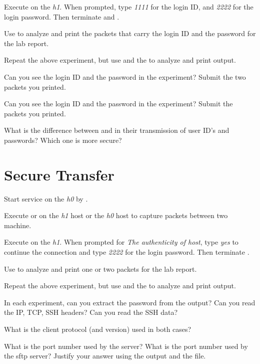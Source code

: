 \documentclass{../UTNetLab}
\begin{document}
    Execute  on the \textit{h1}.
    When prompted, type \textit{1111} for the login ID, and \textit{2222} for the login password.
    Then terminate  and .

    Use  to analyze and print the packets that carry the login ID and the password for the lab report.

    Repeat the above experiment, but use  and the  to analyze and print output.

    \begin{report}
        \item Can you see the login ID and the password in the  experiment? Submit the two packets you printed.
        
        \item Can you see the login ID and the password in the  experiment? Submit the packets you printed.
        
        \item What is the difference between  and  in their transmission of user ID’s and passwords? Which one is more secure?
    \end{report}

\section{Secure Transfer}
    Start  service on the \textit{h0} by .
    
    Execute  or  on the \textit{h1} host or the \textit{h0} host to capture packets between two machine.

    Execute  on the \textit{h1}.
    When prompted for \textit{The authenticity of host}, type \textit{yes} to continue the connection and type \textit{2222} for the login password.
    Then terminate .

    Use  to analyze and print one or two  packets for the lab report.

    Repeat the above experiment, but use  and the  to analyze and print output.

    \begin{report}
        \item In each experiment, can you extract the password from the  output?
            Can you read the IP, TCP, SSH headers?
            Can you read the SSH data?
        
        \item What is the client protocol (and version) used in both cases?
        
        \item What is the port number used by the  server?
            What is the port number used by the sftp server?
            Justify your answer using the  output and the  file.
    \end{report}
\end{document}
